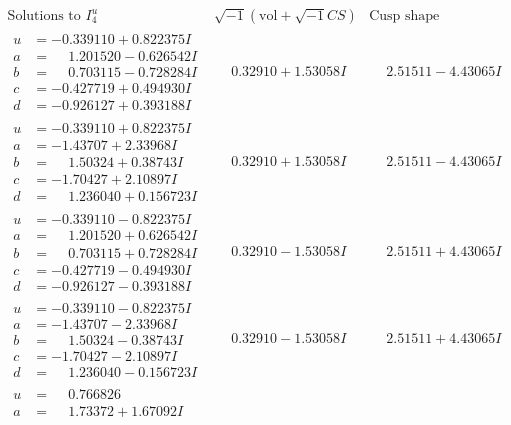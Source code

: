 \documentclass[1p]{elsarticle_modified}
\theoremstyle{definition}
\newcommand{\I}{\sqrt{-1}}
\begin{document}
$$\begin{array}{c|c|c}  
\text{Solutions to }I^u_{4}& \I (\text{vol} + \sqrt{-1}CS) & \text{Cusp shape}\\
 \hline 
\begin{aligned}
u &= -0.339110 + 0.822375 I \\
a &= \phantom{-}1.201520 - 0.626542 I \\
b &= \phantom{-}0.703115 - 0.728284 I \\
c &= -0.427719 + 0.494930 I \\
d &= -0.926127 + 0.393188 I\end{aligned}
 & \phantom{-}0.32910 + 1.53058 I & \phantom{-}2.51511 - 4.43065 I \\ \hline\begin{aligned}
u &= -0.339110 + 0.822375 I \\
a &= -1.43707 + 2.33968 I \\
b &= \phantom{-}1.50324 + 0.38743 I \\
c &= -1.70427 + 2.10897 I \\
d &= \phantom{-}1.236040 + 0.156723 I\end{aligned}
 & \phantom{-}0.32910 + 1.53058 I & \phantom{-}2.51511 - 4.43065 I \\ \hline\begin{aligned}
u &= -0.339110 - 0.822375 I \\
a &= \phantom{-}1.201520 + 0.626542 I \\
b &= \phantom{-}0.703115 + 0.728284 I \\
c &= -0.427719 - 0.494930 I \\
d &= -0.926127 - 0.393188 I\end{aligned}
 & \phantom{-}0.32910 - 1.53058 I & \phantom{-}2.51511 + 4.43065 I \\ \hline\begin{aligned}
u &= -0.339110 - 0.822375 I \\
a &= -1.43707 - 2.33968 I \\
b &= \phantom{-}1.50324 - 0.38743 I \\
c &= -1.70427 - 2.10897 I \\
d &= \phantom{-}1.236040 - 0.156723 I\end{aligned}
 & \phantom{-}0.32910 - 1.53058 I & \phantom{-}2.51511 + 4.43065 I \\ \hline\begin{aligned}
u &= \phantom{-}0.766826\phantom{ +0.000000I} \\
a &= \phantom{-}1.73372 + 1.67092 I \\

\end{aligned}
\end{array}$$
\end{document}
